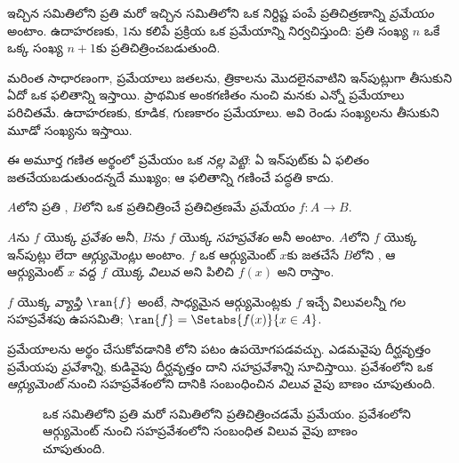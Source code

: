\documentclass[../../../include/open-logic-section]{subfiles}
\begin{document}

\begin{explain}
ఇచ్చిన సమితిలోని ప్రతి  మరో ఇచ్చిన సమితిలోని
ఒక నిర్దిష్ట  పంపే ప్రతిచిత్రణాన్ని
\emph{ప్రమేయం} అంటాం. ఉదాహరణకు, $1$ను కలిపే ప్రక్రియ ఒక ప్రమేయాన్ని
నిర్వచిస్తుంది: ప్రతి సంఖ్య $n$ ఒకే ఒక్క సంఖ్య $n+1$కు ప్రతిచిత్రించబడుతుంది.

మరింత సాధారణంగా, ప్రమేయాలు జతలను, త్రికాలను మొదలైనవాటిని ఇన్‌పుట్లుగా
తీసుకుని ఏదో ఒక ఫలితాన్ని ఇస్తాయి. ప్రాథమిక అంకగణితం నుంచి మనకు ఎన్నో
ప్రమేయాలు పరిచితమే. ఉదాహరణకు, కూడిక, గుణకారం ప్రమేయాలు.
అవి రెండు సంఖ్యలను తీసుకుని మూడో సంఖ్యను ఇస్తాయి.

ఈ అమూర్త గణిత అర్థంలో ప్రమేయం ఒక \emph{నల్ల పెట్టె}:
ఏ ఇన్‌పుట్‌కు ఏ ఫలితం జతచేయబడుతుందన్నదే ముఖ్యం;
ఆ ఫలితాన్ని గణించే పద్ధతి కాదు.
\end{explain}

\begin{defn}[ప్రమేయం]
$A$లోని ప్రతి , $B$లోని ఒక 
ప్రతిచిత్రించే ప్రతిచిత్రణమే \emph{ప్రమేయం} $f \colon A \to B$.

$A$ను $f$ యొక్క \emph{ప్రవేశం} అనీ, $B$ను $f$ యొక్క
\emph{సహప్రవేశం} అనీ అంటాం. $A$లోని  $f$ యొక్క
ఇన్‌పుట్లు లేదా \emph{ఆర్గ్యుమెంట్లు} అంటాం. $f$ ఒక ఆర్గ్యుమెంట్ $x$కు
జతచేసే $B$లోని , ఆ ఆర్గ్యుమెంట్ $x$ వద్ద
\emph{$f$ యొక్క విలువ} అని పిలిచి $f(x)$ అని రాస్తాం.

$f$ యొక్క \emph{వ్యాప్తి} $\ran{f}$ అంటే, సాధ్యమైన ఆర్గ్యుమెంట్లకు
$f$ ఇచ్చే విలువలన్నీ గల సహప్రవేశపు ఉపసమితి;
$\ran{f} = \Setabs{f(x)}{x \in A}$.
\end{defn}

ప్రమేయాలను అర్థం చేసుకోవడానికి లోని పటం ఉపయోగపడవచ్చు.
ఎడమవైపు దీర్ఘవృత్తం ప్రమేయపు \emph{ప్రవేశాన్ని}, కుడివైపు దీర్ఘవృత్తం
దాని \emph{సహప్రవేశాన్ని} సూచిస్తాయి. ప్రవేశంలోని ఒక \emph{ఆర్గ్యుమెంట్}
నుంచి సహప్రవేశంలోని దానికి సంబంధించిన \emph{విలువ} వైపు బాణం చూపుతుంది.

\begin{figure}
  \caption{ఒక సమితిలోని ప్రతి  మరో సమితిలోని
     ప్రతిచిత్రించడమే ప్రమేయం.
    ప్రవేశంలోని ఆర్గ్యుమెంట్ నుంచి సహప్రవేశంలోని సంబంధిత విలువ వైపు బాణం చూపుతుంది.}
\end{figure}
\end{document}
